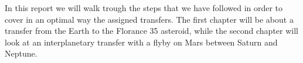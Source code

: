 In this report we will walk trough the steps that we have followed in order to cover in an optimal way the assigned transfers.
The first chapter will be about a transfer from the Earth to the Florance 35 asteroid, while the second chapter will look at an interplanetary transfer with a flyby on Mars between Saturn and Neptune. 

